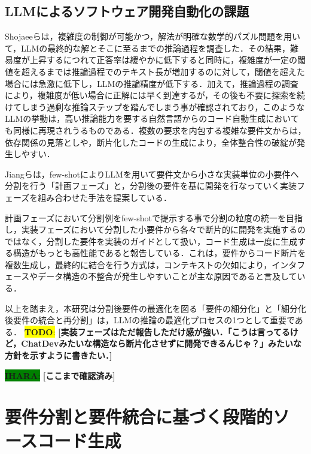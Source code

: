 \documentclass[submit,techrep,noauthor]{ipsj}
\newcommand{\todo}[1]{\colorbox{yellow}{{\bf TODO}:}{\color{red} {\textbf{[#1]}}}}
\newcommand{\ihara}[1]{\colorbox{green}{{\bf IHARA}:}{\color{blue} {\textbf{[#1]}}}}
\begin{document}
\subsection{LLMによるソフトウェア開発自動化の課題}
Shojaeeら\cite{IllusionApple}は，複雑度の制御が可能かつ，解法が明確な数学的パズル問題を用いて，LLMの最終的な解とそこに至るまでの推論過程を調査した．その結果，難易度が上昇するにつれて正答率は緩やかに低下すると同時に，複雑度が一定の閾値を超えるまでは推論過程でのテキスト長が増加するのに対して，閾値を超えた場合には急激に低下し，LLMの推論精度が低下する．加えて，推論過程の調査により，複雑度が低い場合に正解には早く到達するが，その後も不要に探索を続けてしまう過剰な推論ステップを踏んでしまう事が確認されており，このようなLLMの挙動は，高い推論能力を要する自然言語からのコード自動生成においても同様に再現されうるものである．複数の要求を内包する複雑な要件文からは，依存関係の見落としや，断片化したコードの生成により，全体整合性の破綻が発生しやすい．

Jiangら\cite{tosem}は，few-shotによりLLMを用いて要件文から小さな実装単位の小要件へ分割を行う「計画フェーズ」と，分割後の要件を基に開発を行なっていく実装フェーズを組み合わせた手法を提案している．

計画フェーズにおいて分割例をfew-shotで提示する事で分割の粒度の統一を目指し，実装フェーズにおいて分割した小要件から各々で断片的に開発を実施するのではなく，分割した要件を実装のガイドとして扱い，コード生成は一度に生成する構造がもっとも高性能であると報告している．これは，要件からコード断片を複数生成し，最終的に結合を行う方式は，コンテキストの欠如により，インタフェースやデータ構造の不整合が発生しやすいことが主な原因であると言及している．

以上を踏まえ，本研究は分割後要件の最適化を図る「要件の細分化」と「細分化後要件の統合と再分割」は，LLMの推論の最適化プロセスの1つとして重要である．
\todo{実装フェーズはただ報告しただけ感が強い．「こうは言ってるけど，ChatDevみたいな構造なら断片化させずに開発できるんじゃ？」みたいな方針を示すように書きたい．}

\ihara{ここまで確認済み}

\section{要件分割と要件統合に基づく段階的ソースコード生成}
\label{sec:method}
\end{document}
